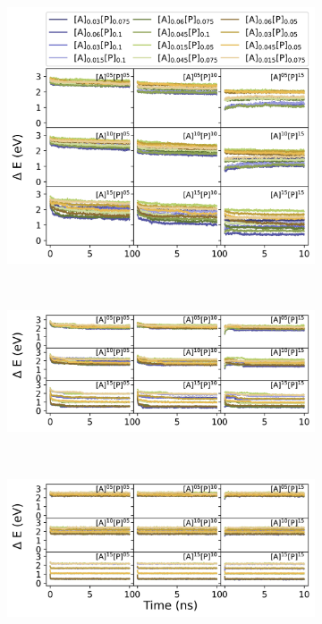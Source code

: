\begin{figure}
\centering
\begin{subfigure}[b]{0.8\textwidth}
    \includegraphics[width=\textwidth]{figures/MD/Env/Rnd75_EDelta.jpeg}
\end{subfigure}\\
\begin{subfigure}[b]{0.8\textwidth}
    \includegraphics[width=\textwidth]{figures/MD/Env/Rnd50_EDelta.jpeg}
    \end{subfigure}\\
\begin{subfigure}[b]{0.8\textwidth}
    \includegraphics[width=\textwidth]{figures/MD/Env/Rnd25_EDelta.jpeg}

\end{subfigure}
\end{figure}
